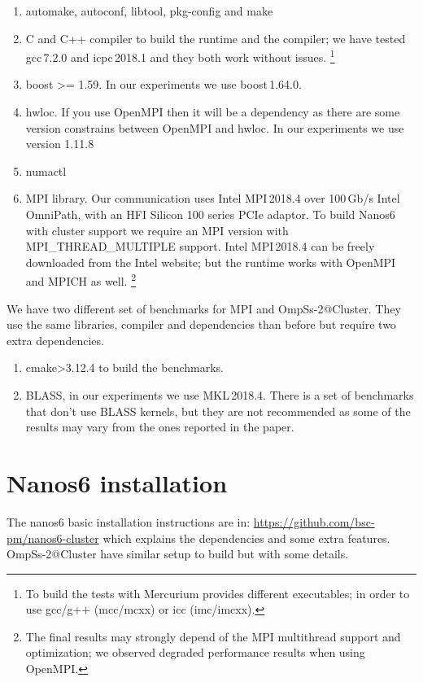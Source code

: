 \documentclass{article}
\begin{document}
\begin{enumerate}
    \item automake, autoconf, libtool, pkg-config and make

    \item C and C++ compiler to build the runtime and the compiler; we have
        tested gcc\,7.2.0 and icpc\,2018.1 and they both work without issues.
        \footnote{To build the tests with Mercurium provides different executables;
        in order to use gcc/g++ (mcc/mcxx) or icc (imc/imcxx).}

    \item boost >= 1.59. In our experiments we use boost\,1.64.0.

    \item hwloc. If you use OpenMPI then it will be a dependency as there are some
        version constrains between OpenMPI and hwloc. In our experiments we use
        version 1.11.8

    \item numactl

    \item MPI library. Our communication uses Intel MPI\,2018.4 over 100\,Gb/s Intel
        OmniPath, with an HFI Silicon 100 series PCIe adaptor. To build Nanos6
        with cluster support we require an MPI version with
        MPI\_THREAD\_MULTIPLE support.  Intel MPI\,2018.4 can be freely
        downloaded from the Intel website; but the runtime works with OpenMPI
        and MPICH as well. \footnote{The final results may strongly depend of
        the MPI multithread support and optimization; we observed degraded
        performance results when using OpenMPI.}
\end{enumerate}

We have two different set of benchmarks for MPI and
OmpSs-2@Cluster. They use the same libraries, compiler and
dependencies than before but require two extra dependencies.

\begin{enumerate}
    \item cmake>3.12.4 to build the benchmarks.
    \item BLASS, in our experiments we use MKL\,2018.4. There is a set of benchmarks
        that don't use BLASS kernels, but they are not recommended as some of the
        results may vary from the ones reported in the paper.
\end{enumerate}

\section{Nanos6 installation}

The nanos6 basic installation instructions are in:
\url{https://github.com/bsc-pm/nanos6-cluster} which explains the
dependencies and some extra features.  OmpSs-2@Cluster have similar
setup to build but with some details.
\end{document}
